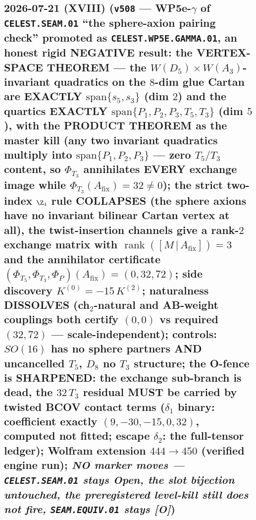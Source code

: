 \documentclass[11pt]{article}
\providecommand{\mO}{\textbf{[O]}}\providecommand{\mX}{\textbf{[X]}}
\begin{document}
\subsection*{2026-07-21 (XVIII) (\texttt{v508} --- WP5e-$\gamma$ of \texttt{CELEST.SEAM.01} ``the sphere-axion pairing check'' promoted as \texttt{CELEST.WP5E.GAMMA.01}, an honest rigid NEGATIVE result: the VERTEX-SPACE THEOREM --- the $W(D_5){\times}W(A_3)$-invariant quadratics on the $8$-dim glue Cartan are EXACTLY $\mathrm{span}\{s_5,s_3\}$ (dim $2$) and the quartics EXACTLY $\mathrm{span}\{P_1,P_2,P_3,T_5,T_3\}$ (dim $5$), with the PRODUCT THEOREM as the master kill (any two invariant quadratics multiply into $\mathrm{span}\{P_1,P_2,P_3\}$ --- zero $T_5/T_3$ content, so $\Phi_{T_3}$ annihilates EVERY exchange image while $\Phi_{T_3}(A_{\mathrm{fix}})=32\neq0$); the strict two-index $\Z_4$ rule COLLAPSES (the sphere axions have no invariant bilinear Cartan vertex at all), the twist-insertion channels give a rank-$2$ exchange matrix with $\operatorname{rank}([M\,|\,A_{\mathrm{fix}}])=3$ and the annihilator certificate $(\Phi_{T_5},\Phi_{T_3},\Phi_P)(A_{\mathrm{fix}})=(0,32,72)$; side discovery $K^{(0)}=-15\,K^{(2)}$; naturalness DISSOLVES (ch$_2$-natural and AB-weight couplings both certify $(0,0)$ vs required $(32,72)$ --- scale-independent); controls: $SO(16)$ has no sphere partners AND uncancelled $T_5$, $D_8$ no $T_3$ structure; the O-fence is SHARPENED: the exchange sub-branch is dead, the $32\,T_3$ residual MUST be carried by twisted BCOV contact terms ($\delta_1$ binary: coefficient exactly $(9,-30,-15,0,32)$, computed not fitted; escape $\delta_2$: the full-tensor ledger); Wolfram extension $444\to450$ (verified engine run); \emph{NO marker moves --- \texttt{CELEST.SEAM.01} stays Open, the slot bijection untouched, the preregistered level-kill still does not fire, \texttt{SEAM.EQUIV.01} stays \mO})}
\end{document}
